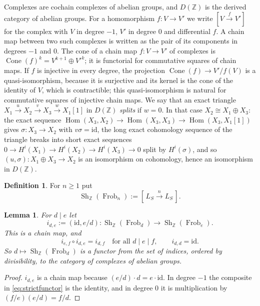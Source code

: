 \documentclass[11pt]{amsart}
\newtheorem{lemma}[theorem]{Lemma}
\theoremstyle{definition}
\newtheorem{definition}[theorem]{Definition}
\newcommand{\Z}{\mathbb Z}
\newcommand{\Frob}{\operatorname{Frob}}
\newcommand{\Sh}{\operatorname{Sh}}
\newcommand{\Hom}{\operatorname{Hom}}
\newcommand{\Cone}{\operatorname{Cone}}
\begin{document}
Complexes are cochain complexes of abelian groups, and $D(\Z)$ is the derived
category of abelian groups.  For a homomorphism $f:V\to V'$ we write
$[V\xrightarrow{f}V']$ for the complex with $V$ in degree $-1$, $V'$ in
degree $0$ and differential $f$.  A chain map between two such complexes is written
as the pair of its components in degrees $-1$ and $0$.  The cone of a chain
map $f:V\to V'$ of complexes is $\Cone(f)^k=V^{k+1}\oplus V'^k$; it is
functorial for commutative squares of chain maps.  If $f$ is injective in
every degree, the projection $\Cone(f)\to V'/f(V)$ is a quasi-isomorphism,
because it is surjective and its kernel is the cone of the identity of $V$,
which is contractible; this quasi-isomorphism is natural for commutative
squares of injective chain maps.  We say that an exact triangle
$X_1\xrightarrow{u}X_2\xrightarrow{v}X_3\xrightarrow{w}X_1[1]$ in $D(\Z)$
\emph{splits} if $w=0$.  In that case $X_2\cong X_1\oplus X_3$: the exact
sequence $\Hom(X_3,X_2)\to\Hom(X_3,X_3)\to\Hom(X_3,X_1[1])$ gives
$\sigma:X_3\to X_2$ with $v\sigma=\mathrm{id}$, the long exact cohomology
sequence of the triangle breaks into short exact sequences
$0\to H^i(X_1)\to H^i(X_2)\to H^i(X_3)\to0$ split by $H^i(\sigma)$, and so
$(u,\sigma):X_1\oplus X_3\to X_2$ is an isomorphism on cohomology, hence an
isomorphism in $D(\Z)$.

\begin{definition}\label{def:shadow}
For $n\ge1$ put
\begin{equation}\label{eq:shadow}
  \Sh_\Z(\Frob_n):=[\,L_S\xrightarrow{\ n\ }L_S\,].
\end{equation}
\end{definition}

\begin{lemma}\label{lem:shfunctor}
For $d\mid e$ let
\[
  i_{d,e}:=(\mathrm{id},e/d):\Sh_\Z(\Frob_d)\longrightarrow\Sh_\Z(\Frob_e).
\]
This is a chain map, and
\begin{equation}\label{eq:strictfunctor}
  i_{e,f}\circ i_{d,e}=i_{d,f}\quad\text{for all } d\mid e\mid f,
  \qquad i_{d,d}=\mathrm{id}.
\end{equation}
So $d\mapsto\Sh_\Z(\Frob_d)$ is a functor from the set of indices, ordered by
divisibility, to the category of complexes of abelian groups.
\end{lemma}

\begin{proof}
$i_{d,e}$ is a chain map because $(e/d)\cdot d=e\cdot\mathrm{id}$.  In degree
$-1$ the composite in \eqref{eq:strictfunctor} is the identity, and in degree
$0$ it is multiplication by $(f/e)(e/d)=f/d$.
\end{proof}
\end{document}
